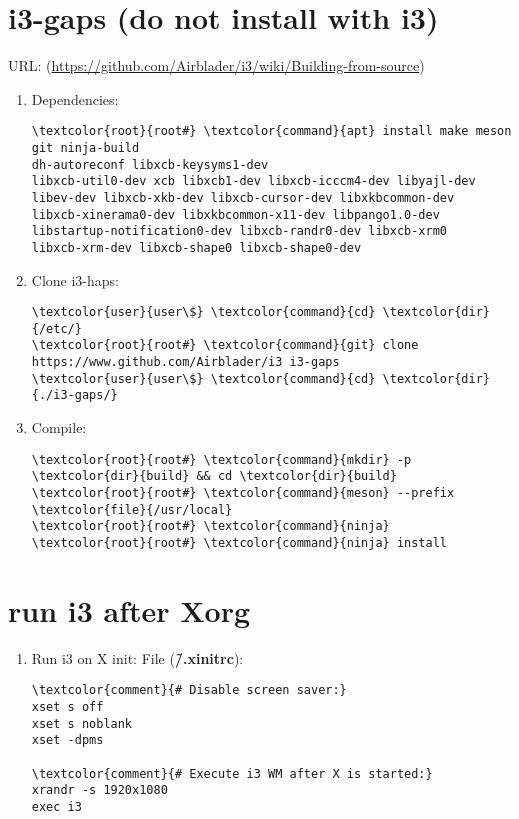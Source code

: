 \documentclass[10pt, a4paper, onecolumn, openany]{book} %
\begin{document}
\section{i3-gaps (do not install with i3)}
URL: (\underline{https://github.com/Airblader/i3/wiki/Building-from-source})
\begin{enumerate}
    \item Dependencies:
\begin{Verbatim}[commandchars=\\\{\}]
\textcolor{root}{root#} \textcolor{command}{apt} install make meson git ninja-build
dh-autoreconf libxcb-keysyms1-dev
libxcb-util0-dev xcb libxcb1-dev libxcb-icccm4-dev libyajl-dev
libev-dev libxcb-xkb-dev libxcb-cursor-dev libxkbcommon-dev 
libxcb-xinerama0-dev libxkbcommon-x11-dev libpango1.0-dev
libstartup-notification0-dev libxcb-randr0-dev libxcb-xrm0 
libxcb-xrm-dev libxcb-shape0 libxcb-shape0-dev
\end{Verbatim} 
    \item Clone i3-haps:
\begin{Verbatim}[commandchars=\\\{\}]
\textcolor{user}{user\$} \textcolor{command}{cd} \textcolor{dir}{/etc/}
\textcolor{root}{root#} \textcolor{command}{git} clone https://www.github.com/Airblader/i3 i3-gaps
\textcolor{user}{user\$} \textcolor{command}{cd} \textcolor{dir}{./i3-gaps/}
\end{Verbatim}
    \item Compile:
\begin{Verbatim}[commandchars=\\\{\}]
\textcolor{root}{root#} \textcolor{command}{mkdir} -p \textcolor{dir}{build} && cd \textcolor{dir}{build}
\textcolor{root}{root#} \textcolor{command}{meson} --prefix \textcolor{file}{/usr/local}
\textcolor{root}{root#} \textcolor{command}{ninja}
\textcolor{root}{root#} \textcolor{command}{ninja} install
\end{Verbatim}
\end{enumerate}
\section{run i3 after Xorg}
\begin{enumerate}
    \item Run i3 on X init:
\newline File (\textbf{\textcolor{file}{\~/.xinitrc}}):
\begin{Verbatim}[commandchars=\\\{\}]
\textcolor{comment}{# Disable screen saver:}
xset s off
xset s noblank
xset -dpms

\textcolor{comment}{# Execute i3 WM after X is started:}
xrandr -s 1920x1080
exec i3
\end{Verbatim}
\end{enumerate}
\end{document}
